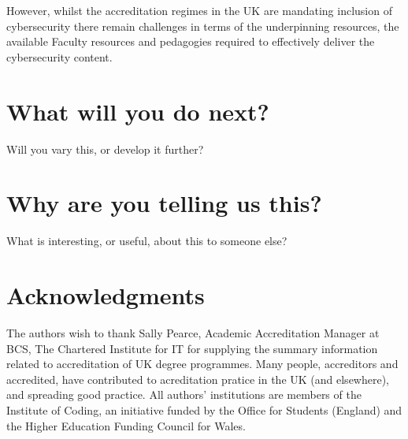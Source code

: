 \documentclass[sigconf]{acmart}
\begin{document}
However, whilst the accreditation regimes in the UK are mandating inclusion of cybersecurity there remain challenges in terms of the underpinning resources, the available Faculty resources and pedagogies required to effectively deliver the cybersecurity content.

\section {What will you do next?}	Will you vary this, or develop it further?
\section{Why are you telling us this?}	What is interesting, or useful, about this to someone else?

\section{Acknowledgments}
The authors wish to thank Sally Pearce, Academic Accreditation Manager at BCS, The Chartered Institute for IT for supplying the summary information related to accreditation of UK degree programmes. Many people, accreditors and accredited, have contributed to acreditation pratice in the UK (and elsewhere), and spreading good practice.  All authors' institutions are members of the Institute of Coding, an initiative funded by the Office for Students (England) and the Higher Education Funding Council for Wales.

%

\end{document}
